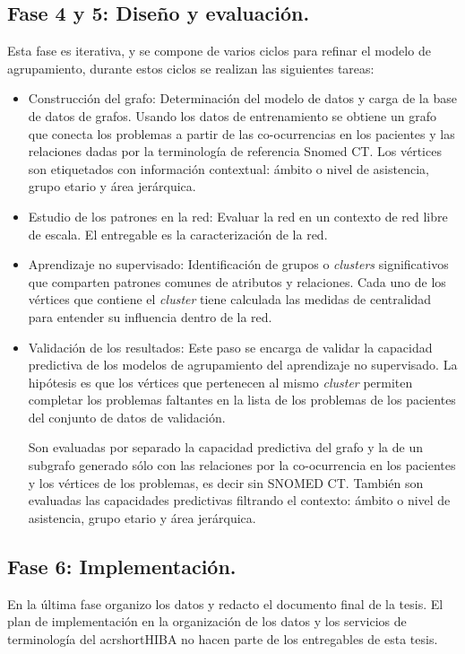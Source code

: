 \subsection{Fase 4 y 5: Diseño y evaluación.} Esta fase es iterativa, y se compone de varios ciclos para refinar el modelo de agrupamiento, durante estos ciclos se realizan las siguientes tareas:
\begin{itemize}
\item Construcción del grafo: Determinación del modelo de datos y carga de la base de datos de grafos. Usando los datos de entrenamiento se obtiene un grafo que conecta los problemas a partir de las co-ocurrencias en los pacientes y las relaciones dadas por la terminología de referencia Snomed CT. Los vértices son etiquetados con información contextual: ámbito o nivel de asistencia, grupo etario y área jerárquica.  

\item Estudio de los patrones en la red: Evaluar la red en un contexto de red libre de escala. El entregable es la caracterización de la red.

\item Aprendizaje no supervisado: Identificación de grupos o \textit{clusters} significativos que comparten patrones comunes de atributos y relaciones. Cada uno de los vértices que contiene el \textit{cluster} tiene calculada las medidas de centralidad para entender su influencia dentro de la red.

\item Validación de los resultados: Este paso se encarga de validar la capacidad predictiva de los modelos de agrupamiento del aprendizaje no supervisado. La hipótesis es que los vértices que pertenecen al mismo \textit{cluster} permiten completar los problemas faltantes en la lista de los problemas de los pacientes del conjunto de datos de validación. 

Son evaluadas por separado la capacidad predictiva del grafo y la de un subgrafo generado sólo con las relaciones por la co-ocurrencia en los pacientes y los vértices de los problemas, es decir sin SNOMED CT. También son evaluadas las capacidades predictivas filtrando el contexto: ámbito o nivel de asistencia, grupo etario y área jerárquica.
 \end{itemize}
 
\subsection{Fase 6: Implementación.} En la última fase organizo los datos y redacto el documento final de la tesis. El plan de implementación en la organización de los datos y los servicios de terminología del acrshort{HIBA} no hacen parte de los entregables de esta tesis.

